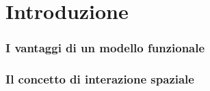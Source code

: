 \section{Introduzione}

\begin{frame}
	\frametitle{I vantaggi di un modello funzionale}
\end{frame}

\begin{frame}
	\frametitle{Il concetto di interazione spaziale}
\end{frame}